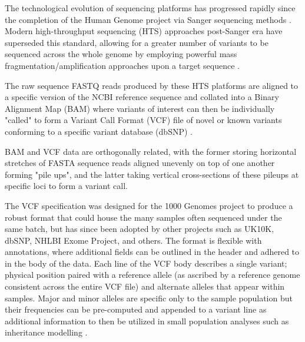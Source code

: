 \documentclass{bioinfo}
\begin{document}
\enlargethispage{0.5cm}

The technological evolution of sequencing platforms has progressed rapidly since the completion of the Human Genome project via Sanger sequencing methods \citep{lander2001initial,sanger1977dna}. Modern high-throughput sequencing (HTS) approaches post-Sanger era have superseded this standard, allowing for a greater number of variants to be sequenced across the whole genome by employing powerful mass fragmentation/amplification approaches upon a target sequence \citep{lengauer2007bioinformatics,bockenhauer2012genetic}.


The raw sequence FASTQ reads produced by these HTS platforms are aligned to a specific version of the NCBI reference sequence and collated into a Binary Alignment Map (BAM) where variants of interest can then be individually "called" to form a Variant Call Format (VCF) file of novel or known variants conforming to a specific variant database (dbSNP) \citep{li2009sequence,danecek2011variant}.

BAM and VCF data are orthogonally related, with the former storing horizontal stretches of FASTA sequence reads aligned unevenly on top of one another forming "pile ups", and the latter taking vertical cross-sections of these pileups at specific loci to form a variant call.

The VCF specification was designed for the 1000 Genomes project to produce a robust format that could house the many samples often sequenced under the same batch, but has since been adopted by other projects such as UK10K, dbSNP, NHLBI Exome Project, and others. The format is flexible with annotations, where additional fields can be outlined in the header and adhered to in the body of the data. Each line of the VCF body describes a single variant; physical position paired with a reference allele (as ascribed by a reference genome consistent across the entire VCF file) and alternate alleles that appear within samples. Major and minor alleles are specific only to the sample population but their frequencies can be pre-computed and appended to a variant line as additional information to then be utilized in small population analyses such as inheritance modelling \citep{danecek2011variant}.
\end{document}

